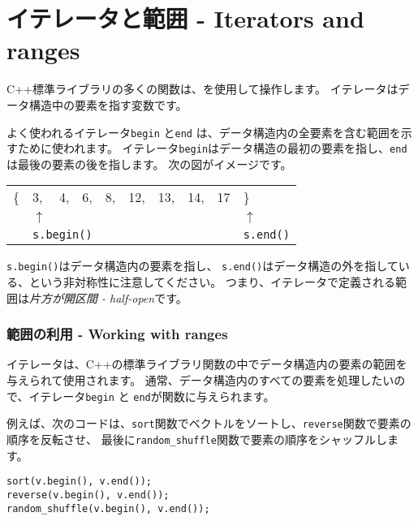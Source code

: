 \section{イテレータと範囲 - Iterators and ranges}


C++標準ライブラリの多くの関数は、を使用して操作します。
イテレータはデータ構造中の要素を指す変数です。

よく使われるイテレータ\texttt{begin}
と\texttt{end} は、データ構造内の全要素を含む範囲を示すために使われます。
イテレータ\texttt{begin}はデータ構造の最初の要素を指し、\texttt{end}は最後の要素の後を指します。
次の図がイメージです。

\begin{center}
\begin{tabular}{llllllllll}
\{ & 3, & 4, & 6, & 8, & 12, & 13, & 14, & 17 & \} \\
& $\uparrow$ & & & & & & & & $\uparrow$ \\
& \multicolumn{3}{l}{\texttt{s.begin()}} & & & & & & \texttt{s.end()} \\
\end{tabular}
\end{center}

\texttt{s.begin()}はデータ構造内の要素を指し、
\texttt{s.end()}はデータ構造の外を指している、という非対称性に注意してください。
つまり、イテレータで定義される範囲は\emph{片方が開区間 - half-open}です。

\subsubsection{範囲の利用 - Working with ranges}

イテレータは、C++の標準ライブラリ関数の中でデータ構造内の要素の範囲を与えられて使用されます。
通常、データ構造内のすべての要素を処理したいので、イテレータ\texttt{begin} と \texttt{end}が関数に与えられます。

例えば、次のコードは、\texttt{sort}関数でベクトルをソートし、\texttt{reverse}関数で要素の順序を反転させ、
最後に\texttt{random\_shuffle}関数で要素の順序をシャッフルします。


\begin{lstlisting}
sort(v.begin(), v.end());
reverse(v.begin(), v.end());
random_shuffle(v.begin(), v.end());
\end{lstlisting}

